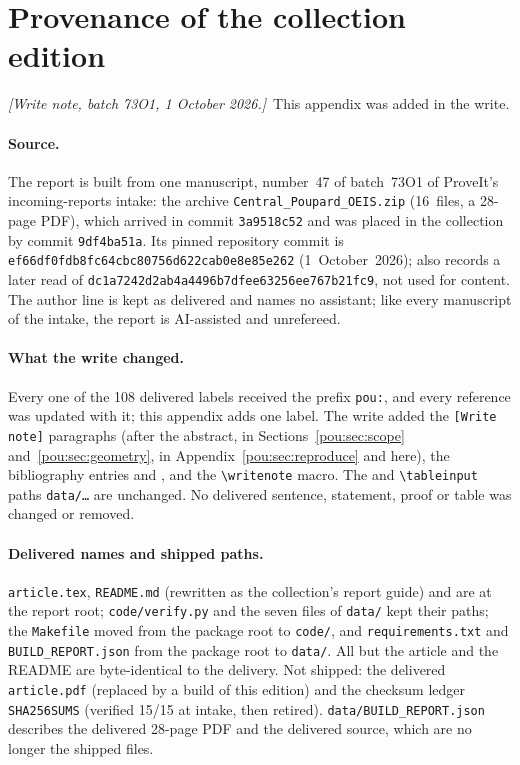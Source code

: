 \documentclass[11pt]{article}
\makeatletter
\theoremstyle{definition}
\theoremstyle{remark}
\newcommand{\tableinput}[1]{\@@input #1 }
\newcommand{\writenote}[1]{\par\smallskip\noindent
 \textit{[Write note, batch 73O1, 1 October 2026.]}\ #1\par\smallskip}
\makeatother
\begin{document}
\section{Provenance of the collection edition}\label{pou:app:edition}

\writenote{This appendix was added in the write.}

\paragraph{Source.} The report is built from one manuscript, number~47
of batch~73O1 of ProveIt's incoming-reports intake: the archive
\texttt{Central\_Poupard\_OEIS.zip} (16~files, a 28-page PDF), which
arrived in commit \texttt{3a9518c52} and was placed in the collection by
commit \texttt{9df4ba51a}. Its pinned repository commit is
\texttt{ef66df0fdb8fc64cbc80756d622cab0e8e85e262} (1~October~2026);
 also records a later read of
\texttt{dc1a7242d2ab4a4496b7dfee63256ee767b21fc9}, not used for content.
The author line is kept as delivered and names no assistant; like every
manuscript of the intake, the report is AI-assisted and unrefereed.

\paragraph{What the write changed.} Every one of the 108 delivered
labels received the prefix \texttt{pou:}, and every reference was
updated with it; this appendix adds one label. The write added the
\texttt{[Write note]} paragraphs (after the abstract, in
Sections~\ref{pou:sec:scope} and~\ref{pou:sec:geometry}, in
Appendix~\ref{pou:sec:reproduce} and here), the bibliography entries
\cite{bellreport} and \cite{chartpath}, and the \verb|\writenote|
macro. The \verb|| and \verb|\tableinput| paths
\texttt{data/\ldots} are unchanged. No delivered sentence, statement,
proof or table was changed or removed.

\paragraph{Delivered names and shipped paths.} \texttt{article.tex},
\texttt{README.md} (rewritten as the collection's report guide) and
 are at the report root; \texttt{code/verify.py} and
the seven files of \texttt{data/} kept their paths; the
\texttt{Makefile} moved from the package root to \texttt{code/}, and
\texttt{requirements.txt} and \texttt{BUILD\_REPORT.json} from the
package root to \texttt{data/}. All but the article and the README are
byte-identical to the delivery. Not shipped: the delivered
\texttt{article.pdf} (replaced by a build of this edition) and the
checksum ledger \texttt{SHA256SUMS} (verified 15/15 at intake, then
retired). \texttt{data/BUILD\_REPORT.json} describes the delivered
28-page PDF and the delivered source, which are no longer the shipped
files.
\end{document}
